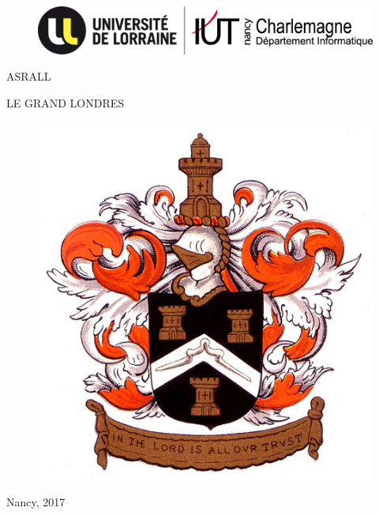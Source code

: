 \documentclass{article}
\begin{document}
\newpage
\begin{titlepage}
\begin{figure}[ht]
\begin{center}
\vspace{1.5cm}
\includegraphics[scale=1.2]{./images/logo.jpg}
\label{escudouam1}
\vspace{-1cm}
\end{center}
\end{figure}
\begin{center}


\vspace{2.3cm} {\LARGE ASRALL}


\vspace{1.5cm} {\Huge LE GRAND LONDRES}

\begin{figure}[ht]
\begin{center}
\vspace{0.8cm}

\includegraphics[scale=0.6]{./images/london.jpg}
\label{logo}
\vspace{-1cm}
\end{center}
\end{figure}

\vspace{1.8cm} Nancy, 2017
\end{center}
\end{titlepage}
\end{document}
